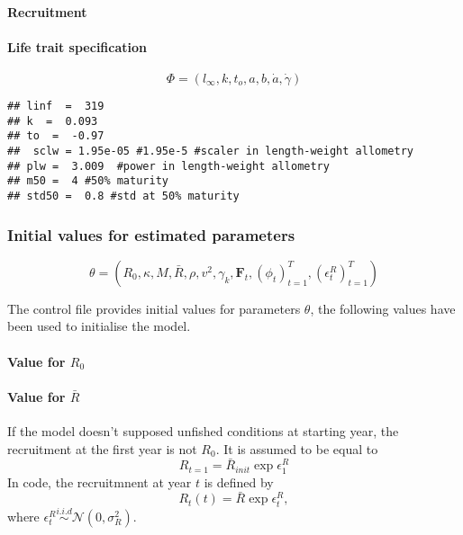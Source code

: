 \paragraph{Recruitment}


\paragraph{Life trait specification}

$$\Phi = (l_\infty, k, t_o,a,b,\dot{a},\dot{\gamma})$$
\begin{verbatim}
## linf  =  319
## k  =  0.093
## to  =  -0.97
##  sclw = 1.95e-05 #1.95e-5 #scaler in length-weight allometry
## plw =  3.009  #power in length-weight allometry
## m50 =  4 #50% maturity
## std50 =  0.8 #std at 50% maturity
\end{verbatim}




\subsubsection{Initial values for estimated parameters}
$$\theta   =  (R_0,   \kappa,   M,  \bar{R},   \rho,  v^2,   \gamma_k,
\boldsymbol{F}_{t}, (\phi_t)_{t=1}^T, (\epsilon_t^R)_{t=1}^T)$$



        
        The  control  file  provides  initial  values  for  parameters
        $\theta$, the  following values  have been used  to initialise
        the model.

\paragraph{Value for $R_0$}


\paragraph{Value for $\bar{R}$}
If the  model doesn't supposed  unfished conditions at  starting year,
the recruitment at  the first year is  not $R_0$. It is  assumed to be
equal to
$$R_{t=1} = \bar{R}_{init} \exp{\epsilon_1^R}$$
In \iscam code, the recruitmnent at year $t$ is defined by
$$R_t(t)=\bar{R} \exp{\epsilon_t^R}, $$
  where $\epsilon_t^R\overset{i.i.d}{\sim} \mathcal{N}(0,\sigma_R^2)$.



